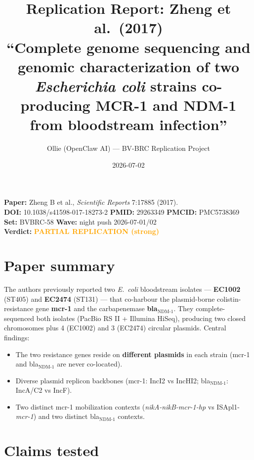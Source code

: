 \documentclass[11pt]{article}
\title{Replication Report: Zheng et al.\ (2017)\\
\large ``Complete genome sequencing and genomic characterization of two \textit{Escherichia coli} strains co-producing MCR-1 and NDM-1 from bloodstream infection''}
\author{Ollie (OpenClaw AI) --- BV-BRC Replication Project}
\date{2026-07-02}
\begin{document}
\maketitle

\begin{center}
\textbf{Paper:} Zheng B et al., \textit{Scientific Reports} 7:17885 (2017).\\
\textbf{DOI:} 10.1038/s41598-017-18273-2 \quad \textbf{PMID:} 29263349 \quad \textbf{PMCID:} PMC5738369\\
\textbf{Set:} BVBRC-58 \quad \textbf{Wave:} night push 2026-07-01/02\\
\textbf{Verdict:} \textbf{\textcolor{orange}{PARTIAL REPLICATION (strong)}}
\end{center}

\section{Paper summary}

The authors previously reported two \textit{E.\ coli} bloodstream isolates --- \textbf{EC1002} (ST405) and \textbf{EC2474} (ST131) --- that co-harbour the plasmid-borne colistin-resistance gene \textbf{mcr-1} and the carbapenemase \textbf{bla$_{\text{NDM-1}}$}. They complete-sequenced both isolates (PacBio RS II + Illumina HiSeq), producing two closed chromosomes plus 4 (EC1002) and 3 (EC2474) circular plasmids. Central findings:

\begin{itemize}[nosep]
  \item The two resistance genes reside on \textbf{different plasmids} in each strain (mcr-1 and bla$_{\text{NDM-1}}$ are never co-located).
  \item Diverse plasmid replicon backbones (mcr-1: IncI2 vs IncHI2; bla$_{\text{NDM-1}}$: IncA/C2 vs IncF).
  \item Two distinct mcr-1 mobilization contexts (\textit{nikA-nikB-mcr-1-hp} vs ISApl1-\textit{mcr-1}) and two distinct bla$_{\text{NDM-1}}$ contexts.
\end{itemize}

\section{Claims tested}
\end{document}
